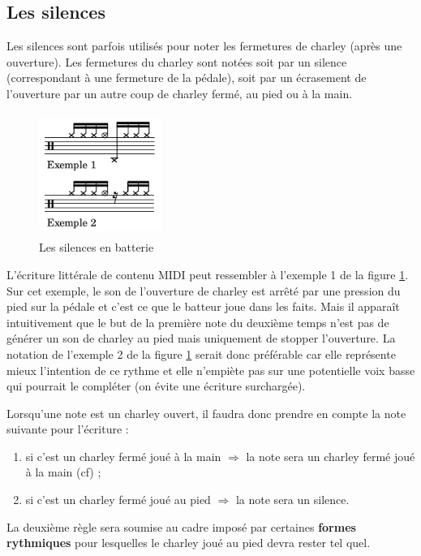 \subsection*{Les silences}
Les silences sont parfois utilisés pour noter les fermetures de charley (après
une ouverture). Les fermetures du charley sont notées soit par un silence
(correspondant à une fermeture de la pédale), soit par un écrasement de
l’ouverture par un autre coup de charley fermé, au pied ou à la main.

\begin{figure}[h]
	\centering
	\includegraphics[height=40mm, width=40mm]{
    z_images/3_methodes/0_notation_de_la_batterie/5_silence_joue.png}
	\caption{Les silences en batterie}
	\label{silence joue}
\end{figure}

L’écriture littérale de contenu MIDI peut ressembler à l’exemple 1 de la figure
\ref{silence joue}. Sur cet exemple, le son de l’ouverture de charley est
arrêté par une pression du pied sur la pédale et c’est ce que le batteur joue
dans les faits. Mais il apparaît intuitivement que le but de la première note
du deuxième temps n’est pas de générer un son de charley au pied mais
uniquement de stopper l’ouverture. La notation de l’exemple 2 de la figure
\ref{silence joue} serait donc préférable car elle représente mieux l’intention
de ce rythme et elle n’empiète pas sur une potentielle voix basse qui pourrait
le compléter (on évite une écriture surchargée).

Lorsqu’une note est un charley ouvert, il faudra donc prendre en compte la note
suivante pour l’écriture :
\begin{enumerate}
    \item si c’est un charley fermé joué à la main $\Rightarrow$ la note sera
        un charley fermé joué à la main (cf) ;
    \item si c’est un charley fermé joué au pied $\Rightarrow$ la note sera un
        silence.
\end{enumerate}
La deuxième règle sera soumise au cadre imposé par certaines
\textbf{formes rythmiques} pour lesquelles le charley joué au pied devra rester
tel quel. 

